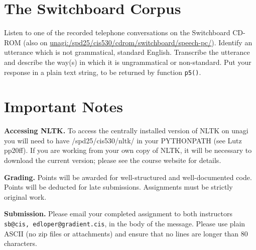 \documentclass{cis530}
\begin{document}
\section{The Switchboard Corpus}

Listen to one of the recorded telephone conversations on the
Switchboard CD-ROM (also on
\url{unagi:/spd25/cis530/cdrom/switchboard/speech-pc/}).  Identify an
utterance which is not grammatical, standard English.  Transcribe the
utterance and describe the way(s) in which it is ungrammatical or
non-standard.  Put your response in a plain text string, to be returned
by function \texttt{p5()}.

\section{Important Notes}

{\bf Accessing NLTK.}
To access the centrally installed version of NLTK on
unagi you will need to have /spd25/cis530/nltk/ in your
PYTHONPATH (see Lutz pp20ff).  If you are working from your own
copy of NLTK, it will be necessary to download the current version;
please see the course website for details.

{\bf Grading.}
Points will be awarded for well-structured and well-documented code.
Points will be deducted for late submissions.
Assignments must be strictly original work.

{\bf Submission.}
Please email your completed assignment to both instructors
\texttt{sb@cis, edloper@gradient.cis}, in the body of the message.
Please use plain ASCII (no zip files or attachments) and ensure
that no lines are longer than 80 characters.
\end{document}
